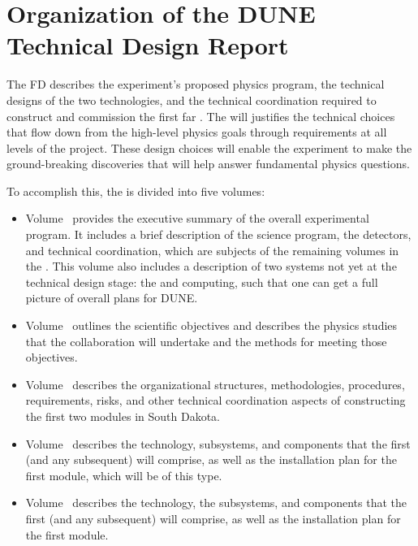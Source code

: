\section{Organization of the DUNE Technical Design Report}


The  FD  describes the experiment's proposed physics program, the 
technical designs of the two   technologies, and the technical coordination required to construct and commission the first far .
The  will justifies the technical choices that flow down from the high-level physics goals through requirements at all levels of the project. These design choices will enable the  experiment to make the ground-breaking discoveries that will help answer 
fundamental physics questions. 

To accomplish this, the    is divided into five volumes:

\begin{itemize}
\item Volume~\volnumberexec{} provides the executive summary of the overall experimental program. It includes a brief description of the  science program, the  detectors, and technical coordination, which are subjects of the remaining volumes in the . This volume also includes a description of two systems not yet at the technical design stage: the   and  computing, such that one can get a full picture of overall plans for DUNE.
\item Volume~\volnumberphysics{} outlines the scientific objectives and describes the physics studies that the  collaboration will undertake and the methods for meeting those objectives.
\item Volume~\volnumbertc{} describes the organizational structures,  methodologies, procedures, requirements, risks, and other technical  coordination aspects of constructing the first two  modules in South Dakota.
\item Volume~\volnumbersp{} describes the   technology, subsystems, and components that the first (and any subsequent)   will comprise, as well as the installation plan for the first  module, which will be of this type. 
\item Volume~\volnumberdp{} describes the   technology, the subsystems, and components that  the first (and any subsequent)   will comprise, as well as the installation plan for the first  module. 
\end{itemize}

